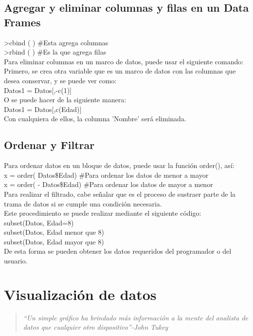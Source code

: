 \documentclass{article}
\begin{document}
\subsection{Agregar y eliminar columnas y filas en un Data Frames}
>cbind ( ) \#Esta agrega columnas \\
>rbind ( ) \#Es la que agrega filas\\

Para eliminar columnas en un marco de datos, puede usar el siguiente comando:\\
Primero, se crea otra variable que es un marco de datos con las columnas que desea conservar, y se puede ver como:\\

Datos1 = Datos[,-c(1)] \\
O se puede hacer de la siguiente manera:\\
Datos1 = Datos[,c(Edad)] \\
Con cualquiera de ellos, la columna 'Nombre' será eliminada.
\subsection{Ordenar y Filtrar }
Para ordenar datos en un bloque de datos, puede usar la función order(), así:\\

x = order( Datos\$Edad) \#Para ordenar los datos de menor a mayor\\
x = order( - Datos\$Edad) \#Para ordenar los datos de mayor a menor\\

Para realizar el filtrado, cabe señalar que es el proceso de sustraer parte de la trama de datos si se cumple una condición necesaria.\\

Este procedimiento se puede realizar mediante el siguiente código:\\

subset(Datos, Edad=8)\\
 subset(Datos, Edad menor que 8)\\
subset(Datos, Edad mayor que 8)\\

De esta forma se pueden obtener los datos requeridos del programador o del usuario.\\




\section{Visualización de datos}
\begin{quote}
    \textit{“Un simple gráfico ha brindado más información a la mente del analista de datos que cualquier otro dispositivo”-John Tukey}
\end{quote}
\end{document}
